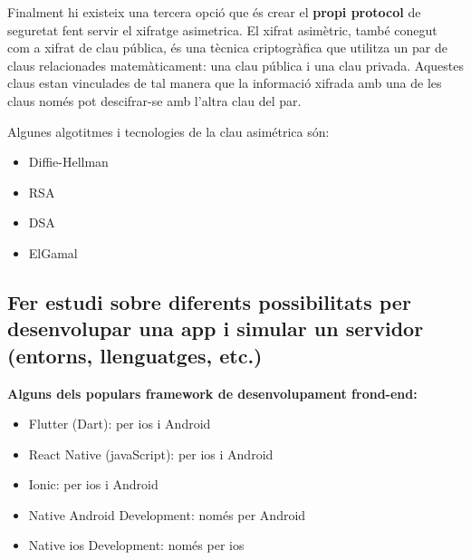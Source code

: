\documentclass[a4paper,12pt,twoside]{ThesisStyle}
\begin{document}
\vspace{3mm}

Finalment hi existeix una tercera opció que és crear el \textbf{propi protocol} de seguretat fent servir el xifratge asimetrica. El xifrat asimètric, també conegut com a xifrat de clau pública, és una tècnica criptogràfica que utilitza un par de claus relacionades matemàticament: una clau pública i una clau privada. Aquestes claus estan vinculades de tal manera que la informació xifrada amb una de les claus només pot descifrar-se amb l'altra clau del par.

Algunes algotitmes i tecnologies de la clau asimétrica són:
\begin{itemize}
    \item Diffie-Hellman
    \item RSA
    \item DSA
    \item ElGamal
\end{itemize}

\vspace{5mm}


\subsection{Fer estudi sobre diferents possibilitats per desenvolupar una app i simular un servidor (entorns, llenguatges, etc.)}


\textbf{Alguns dels populars framework de desenvolupament frond-end:}
\begin{itemize}
    \item Flutter (Dart): per ios i Android
    \item React Native (javaScript): per ios i Android 
    \item Ionic:  per ios i Android 
    \item Native Android Development: només per Android
    \item Native ios Development: només per ios
\end{itemize}

\vspace{5mm}
\end{document}
